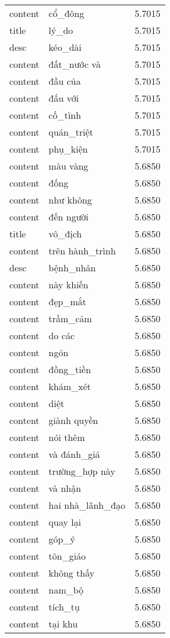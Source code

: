 \documentclass{article}
\begin{document}
\begin{tabular}{lll}
content & cổ\_đông & 5.7015\\
title & lý\_do & 5.7015\\
desc & kéo\_dài & 5.7015\\
content & đất\_nước và & 5.7015\\
content & đầu của & 5.7015\\
content & đấu với & 5.7015\\
content & cố\_tình & 5.7015\\
content & quán\_triệt & 5.7015\\
content & phụ\_kiện & 5.7015\\
content & màu vàng & 5.6850\\
content & đống & 5.6850\\
content & như không & 5.6850\\
content & đến người & 5.6850\\
title & vô\_địch & 5.6850\\
content & trên hành\_trình & 5.6850\\
desc & bệnh\_nhân & 5.6850\\
content & này khiến & 5.6850\\
content & đẹp\_mắt & 5.6850\\
content & trầm\_cảm & 5.6850\\
content & do các & 5.6850\\
content & ngón & 5.6850\\
content & đồng\_tiền & 5.6850\\
content & khám\_xét & 5.6850\\
content & diệt & 5.6850\\
content & giành quyền & 5.6850\\
content & nói thêm & 5.6850\\
content & và đánh\_giá & 5.6850\\
content & trường\_hợp này & 5.6850\\
content & và nhận & 5.6850\\
content & hai nhà\_lãnh\_đạo & 5.6850\\
content & quay lại & 5.6850\\
content & góp\_ý & 5.6850\\
content & tôn\_giáo & 5.6850\\
content & không thấy & 5.6850\\
content & nam\_bộ & 5.6850\\
content & tích\_tụ & 5.6850\\
content & tại khu & 5.6850\\

\end{tabular}
\end{document}
